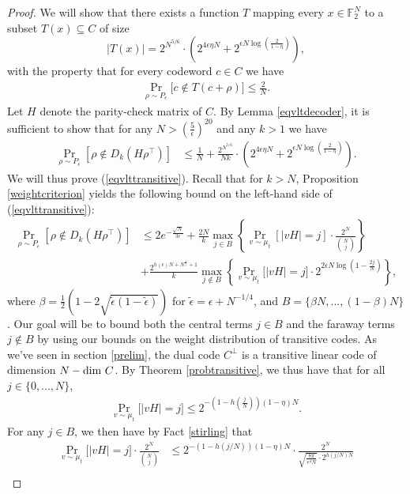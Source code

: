 \documentclass[12pt]{article}
\newcommand{\F}{\mathbb{F}}
\begin{document}
\begin{proof}
We will show that there exists a function $T$ mapping every $x\in\F_2^N$ to a subset $T(x)\subseteq C$ of size
     $$|T(x)|=2^{N^{5/6}}\cdot (2^{4\epsilon \eta N}+2^{\epsilon N\log(\frac{2}{1-\eta})}),$$
     with the property that for every codeword $c\in C$ we have
    \begin{align*}
    \Pr_{\rho\sim P_\epsilon}\big[c\notin T(c+\rho)\big]\leq
   \frac{2}{N}.
    \end{align*}
Let $H$ denote the parity-check matrix of $C$. By Lemma \ref{eqvltdecoder}, it is sufficient to show that for any $N> \left(\frac{5}{\epsilon}\right)^{20}$ and any $k>1$ we have
\begin{align}\label{eqvlttransitive}
    \Pr_{\rho\sim P_\epsilon}[\rho\notin  D_k(H\rho^\intercal )]&\leq \frac{1}{N}+\frac{2^{N^{5/6}}}{Nk}\cdot (2^{4\epsilon \eta N}+2^{\epsilon N\log(\frac{2}{1-\eta})}).
    \end{align}
We will thus prove (\ref{eqvlttransitive}). Recall that for $k>N$, Proposition \ref{weightcriterion} yields the following bound on the left-hand side of (\ref{eqvlttransitive}):
\begin{align}\label{thmbdtransitive}
\Pr_{\rho\sim P_\epsilon}[\rho\notin D_k(H\rho^\intercal)]&\leq 2e^{-\frac{\sqrt{N}}{3\epsilon}}+\frac{2N}{k} \max_{j\in B}\left\{ \Pr_{v\sim \mu_t}[|v H|=j] \cdot \frac{2^N}{\binom{N}{j}}\right\} \nonumber\\
&+\frac{2^{h(\epsilon)N+N^{\frac{4}{5}}+1}}{k}  \max_{ j\notin B}\left\{ \Pr_{v\sim \mu_t}\big[|v H|=j\big]\cdot 2^{2\epsilon N\log(1-\frac{2j}{N})} \right\},
\end{align}
where $\beta=\frac{1}{2}\left( 1-2\sqrt{\tilde{\epsilon}(1-\tilde{\epsilon})} \right)$ for $\tilde{\epsilon}=\epsilon+N^{-1/4}$, and 
$B=\{\beta N,...,(1-\beta )N\}$. Our goal will be to bound both the central terms $j\in B$ and the faraway terms $j\notin B$ by using our bounds on the weight distribution of transitive codes. As we've seen in section \ref{prelim}, the dual code $C^\perp$ is a transitive linear code of dimension $N-\textnormal{dim }C $. By Theorem \ref{probtransitive}, we thus have that for all $j\in\{0,...,N\}$,
\begin{align}\label{weightbd}
    \Pr_{v\sim\mu_t}\big[|vH|=j \big]\leq 2^{-(1-h(\frac{j}{N}))(1-\eta) N}.
\end{align}
For any $j\in B$, we then have by Fact \ref{stirling} that
\begin{align*}
    \Pr_{v\sim\mu_t}\big[|vH|=j \big]\cdot \frac{2^N}{\binom{N}{j}}  &\leq 2^{-(1-h(j/N))(1-\eta) N}\cdot \frac{2^N}{\sqrt{\frac{8\pi}{e^4 N}}\cdot2^{h(j/N)N}}  \\

\end{align*}
\end{proof}
\end{document}
